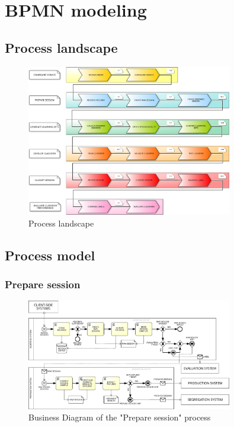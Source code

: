 \section{BPMN modeling}
\label{sec:bpmn_modeling}

\subsection{Process landscape}
\label{sec:bpmn_process_landscape}

\begin{figure}[H]
\centering
\includegraphics[width=0.8\textwidth]{figures/PROCESS LANDSCAPE.pdf}
\caption{Process landscape}
\label{fig:bpmn_process_landscape}
\end{figure}

\subsection{Process model}

\subsubsection{Prepare session}
\label{sec:bpmn_prepare_session}

\begin{figure}[H]
\centering
\includegraphics[width=0.8\textwidth]{figures/Business Diagram - Prepare Session.pdf}
\caption{Business Diagram of the "Prepare session" process}
\label{fig:bpmn_prepare_session}
\end{figure}

